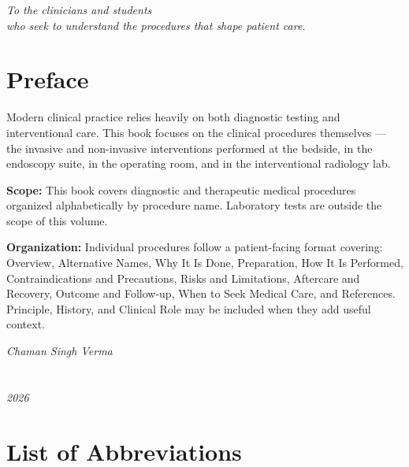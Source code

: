 \documentclass[12pt,oneside]{book}
\begin{document}
\newpage
\thispagestyle{empty}
\vspace*{\fill}
\begin{center}
    \textit{To the clinicians and students\\
    who seek to understand the procedures that shape patient care.}
\end{center}
\vspace*{\fill}

\chapter*{Preface}

Modern clinical practice relies heavily on both diagnostic testing and interventional care. This book focuses on the clinical procedures themselves --- the invasive and non-invasive interventions performed at the bedside, in the endoscopy suite, in the operating room, and in the interventional radiology lab.

\textbf{Scope:} This book covers diagnostic and therapeutic medical procedures organized alphabetically by procedure name. Laboratory tests are outside the scope of this volume.

\textbf{Organization:} Individual procedures follow a patient-facing format covering: Overview, Alternative Names, Why It Is Done, Preparation, How It Is Performed, Contraindications and Precautions, Risks and Limitations, Aftercare and Recovery, Outcome and Follow-up, When to Seek Medical Care, and References. Principle, History, and Clinical Role may be included when they add useful context.

\vspace{1cm}
\noindent \textit{Chaman Singh Verma}\\\\\\\textit{2026}

\setcounter{tocdepth}{0}
\clearpage
\tableofcontents
\newpage

\chapter*{List of Abbreviations}
\end{document}
